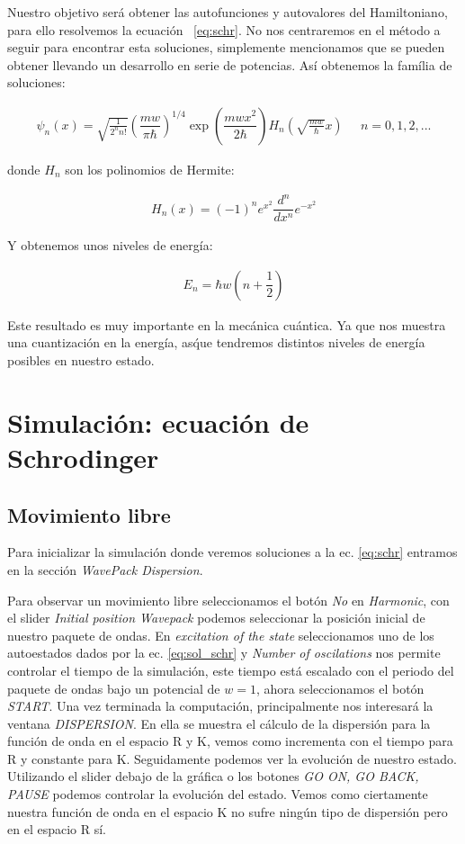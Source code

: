 \documentclass[12pt]{article}
\begin{document}
Nuestro objetivo ser\'a obtener las autofunciones y autovalores del Hamiltoniano, para ello resolvemos la ecuaci\'on ~\eqref{eq:schr}. No nos centraremos en el m\'etodo a seguir para encontrar esta soluciones, simplemente mencionamos que se pueden obtener llevando un desarrollo en serie de potencias. As\'i obtenemos la fam\'ilia de soluciones:

 \begin{align}
\psi_n(x)=\sqrt{\frac{1}{2^n n!}} (\dfrac{mw}{\pi\hbar})^{1/4}\exp(\dfrac{mwx^2}{2\hbar})H_n(\sqrt{\frac{mw}{\hbar}}x) \,\,\,\,\,\,\,\ n=0,1,2,...
\label{eq:sol_schr}
\end{align}

donde $H_n$ son los polinomios de Hermite:

\begin{align}
H_n(x)=(-1)^n e^{x^2} \dfrac{d^n}{dx^n}e^{-x^2}
\label{eq:herm}
\end{align}

Y obtenemos unos niveles de energ\'ia:

\begin{align}
E_n=\hbar w(n+\dfrac{1}{2})
\label{eq:energ}
\end{align}

Este resultado es muy importante en la mec\'anica cu\'antica. Ya que nos muestra una cuantizaci\'on en la energ\'ia, as\' que tendremos distintos niveles de energ\'ia posibles en nuestro estado.
\pagebreak

\section{Simulaci\'on: ecuaci\'on de Schrodinger}
\subsection{Movimiento libre}
Para inicializar la simulaci\'on donde veremos soluciones a la ec. \eqref{eq:schr} entramos en la secci\'on \textit{WavePack Dispersion}.

Para observar un movimiento libre seleccionamos el bot\'on \textit{No} en \textit{Harmonic}, con el slider \textit{Initial position Wavepack} podemos seleccionar la posici\'on inicial de nuestro paquete de ondas. En \textit{excitation of the state} seleccionamos uno de los autoestados dados por la ec. \eqref{eq:sol_schr} y \textit{Number of oscilations} nos permite controlar el tiempo de la simulaci\'on, este tiempo est\'a escalado con el periodo del paquete de ondas bajo un potencial de $w=1$, ahora seleccionamos el bot\'on \textit{START}. Una vez terminada la computaci\'on, principalmente nos interesar\'a la ventana \textit{DISPERSION}. En ella se muestra el c\'alculo de la dispersi\'on para la funci\'on de onda en el espacio R y K, vemos como incrementa con el tiempo para R y constante para K. Seguidamente podemos ver la evoluci\'on de nuestro estado. Utilizando el slider debajo de la gr\'afica o los botones \textit{GO ON, GO BACK, PAUSE} podemos controlar la evoluci\'on del estado. Vemos como ciertamente nuestra funci\'on de onda en el espacio K no sufre ning\'un tipo de dispersi\'on pero en el espacio R s\'i.
\end{document}
